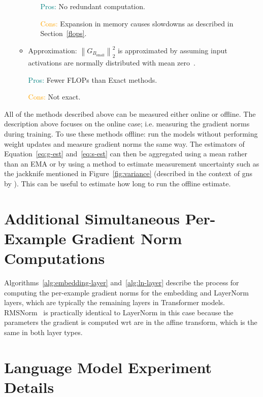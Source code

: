 \documentclass{article}
\newcommand{\Gsmall}{G_{B_{\textrm{small}}}} %
\newcommand{\sqn}[1]{\left\lVert#1\right\rVert_2^2}
\begin{document}
\begin{itemize}
\begin{itemize}
\begin{itemize}
                    \textcolor{teal}{Pros:} No redundant computation.

                    \textcolor{orange}{Cons:} Expansion in memory causes slowdowns as described in Section~\ref{flops}.
                \end{itemize}
            \item Approximation: $\sqn{\Gsmall}$ is approximated by assuming input activations are normally distributed with mean zero~\citep{gray2023efficient}.

            \textcolor{teal}{Pros:} Fewer FLOPs than Exact methods.

            \textcolor{orange}{Cons:} Not exact.
        \end{itemize}
\end{itemize}

All of the methods described above can be measured either online or offline.
The description above focuses on the online case; i.e. measuring the gradient
norms during training. To use these methods offline: run the
models without performing weight updates and measure gradient norms the same way.
The estimators of Equation~\ref{eq:g-est} and~\ref{eq:s-est} can then be
aggregated using a mean rather than an EMA or by using a method to estimate
measurement uncertainty such as the jackknife mentioned in
Figure~\ref{fig:variance} (described in the context of \ac{gns} by
\citet[App.B]{gray2023efficient}). This can be useful to estimate how long to
run the offline estimate.

\section{Additional Simultaneous Per-Example Gradient Norm Computations}\label{app-sim}

Algorithms~\ref{alg:embedding-layer} and~\ref{alg:ln-layer} describe the process
for computing the per-example gradient norms for the embedding and LayerNorm layers,
which are typically the remaining layers in Transformer models. RMSNorm~\citep{zhang2019root}
is practically identical to LayerNorm in this case because the parameters the
gradient is computed wrt are in the affine transform, which is the same in
both layer types.





\section{Language Model Experiment Details}\label{app-experiments}
\end{document}

